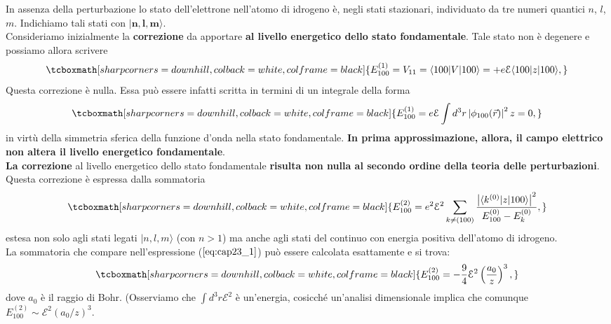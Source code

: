 \documentclass[a4paper,12pt,oneside]{book}
\begin{document}
In assenza della perturbazione lo stato dell'elettrone nell'atomo di idrogeno è, negli stati stazionari, individuato da tre numeri quantici $n$, $l$, $m$. Indichiamo tali stati con $\mathbf{|n,l,m\rangle}$.\\

Consideriamo inizialmente la \textbf{correzione} da apportare \textbf{al livello energetico dello stato fondamentale}. Tale stato non è degenere e possiamo allora scrivere
	\begin{equation}
		\tcboxmath[sharp corners=downhill, colback=white, colframe=black]{
			E^{(1)}_{100}=V_{11}=\langle100| V |100\rangle =+e\mathcal{E}\langle 100 | z |100 \rangle,
			}
	\end{equation}
Questa correzione è nulla. Essa può essere infatti scritta in termini di un integrale della forma
	\begin{equation}
		\tcboxmath[sharp corners=downhill, colback=white, colframe=black]{
			E^{(1)}_{100}=e\mathcal{E} \int d^3r \left|\phi_{100}(\vec{r})\right|^2 z=0,
			}
	\end{equation}
in virtù della simmetria sferica della funzione d'onda nella stato fondamentale. \textbf{In prima approssimazione, allora, il campo elettrico non altera il livello energetico fondamentale}.\\

\textbf{La correzione} al livello energetico dello stato fondamentale \textbf{risulta non nulla al secondo ordine della teoria delle perturbazioni}. Questa correzione è espressa dalla sommatoria
	\begin{equation}
	\label{eq:cap23_1}
		\tcboxmath[sharp corners=downhill, colback=white, colframe=black]{
			E^{(2)}_{100}=e^2 \mathcal{E}^2 \sum_{k\neq(100)}\frac{\left| \langle k^{(0)} | z |100 \rangle \right|^2}{E^{(0)}_{100}-E^{(0)}_{k}},
			}
	\end{equation}
estesa non solo agli stati legati $|n,l,m \rangle$ (con $n>1$) ma anche agli stati del continuo con energia positiva dell'atomo di idrogeno.\\

La sommatoria che compare nell'espressione ($\ref{eq:cap23_1}$) può essere calcolata esattamente e si trova:
	\begin{equation}
		\tcboxmath[sharp corners=downhill, colback=white, colframe=black]{
			E^{(2)}_{100}=-\frac{9}{4} \mathcal{E}^2 \left( \frac{a_0}{z} \right)^3,
			}
	\end{equation}
dove $a_0$ è il raggio di Bohr. (Osserviamo che $\int d^3r \mathcal{E}^2$ è un'energia, cosicché un'analisi dimensionale implica che comunque $E^{(2)}_{100}\sim\mathcal{E}^2\left( a_0/z \right)^3 $.\\
\end{document}
